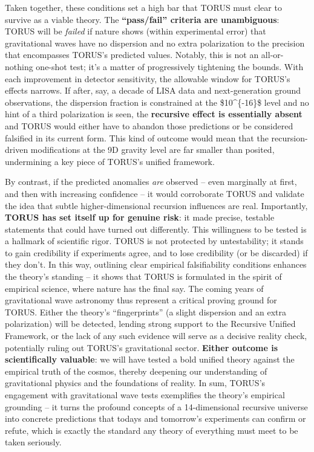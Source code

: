 \documentclass[
]{article}
\begin{document}
{Taken together, these conditions set a high bar that TORUS must clear to
survive as a viable theory. The \textbf{``pass/fail'' criteria are
unambiguous}: TORUS will be \emph{failed} if nature shows (within
experimental error) that gravitational waves have no dispersion and no
extra polarization to the precision that encompasses TORUS's predicted
values\hspace{0pt}. Notably, this is not an all-or-nothing one-shot
test; it's a matter of progressively tightening the bounds. With each
improvement in detector sensitivity, the allowable window for TORUS's
effects narrows. If after, say, a decade of LISA data and
next-generation ground observations, the dispersion fraction is
constrained at the \$10\^{}\{-16\}\$ level and no hint of a third
polarization is seen, the \textbf{recursive effect is essentially
absent} and TORUS would either have to abandon those predictions or be
considered falsified in its current form\hspace{0pt}. This kind of
outcome would mean that the recursion-driven modifications at the 9D
gravity level are far smaller than posited, undermining a key piece of
TORUS's unified framework\hspace{0pt}.

By contrast, if the predicted anomalies \emph{are} observed -- even
marginally at first, and then with increasing confidence -- it would
corroborate TORUS and validate the idea that subtle higher-dimensional
recursion influences are real. Importantly, \textbf{TORUS has set itself
up for genuine risk}: it made precise, testable statements that could
have turned out differently. This willingness to be tested is a hallmark
of scientific rigor. TORUS is not protected by untestability; it stands
to gain credibility if experiments agree, and to lose credibility (or be
discarded) if they don't\hspace{0pt}. In this way, outlining clear
empirical falsifiability conditions enhances the theory's standing -- it
shows that TORUS is formulated in the spirit of empirical science, where
nature has the final say. The coming years of gravitational wave
astronomy thus represent a critical proving ground for TORUS. Either the
theory's ``fingerprints'' (a slight dispersion and an extra
polarization) will be detected, lending strong support to the Recursive
Unified Framework, or the lack of any such evidence will serve as a
decisive reality check, potentially ruling out TORUS's gravitational
sector. \textbf{Either outcome is scientifically valuable}: we will have
tested a bold unified theory against the empirical truth of the cosmos,
thereby deepening our understanding of gravitational physics and the
foundations of reality. In sum, TORUS's engagement with gravitational
wave tests exemplifies the theory's empirical grounding -- it turns the
profound concepts of a 14-dimensional recursive universe into concrete
predictions that today\textquotesingle s and tomorrow's experiments can
confirm or refute, which is exactly the standard any theory of
everything must meet to be taken seriously.\hspace{0pt}

}
\end{document}
